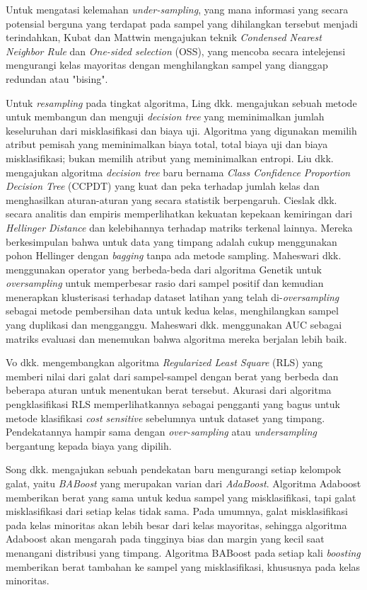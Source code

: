 Untuk mengatasi kelemahan \textit{under-sampling}, yang mana informasi yang secara potensial berguna yang terdapat pada sampel yang dihilangkan tersebut menjadi terindahkan, Kubat dan Mattwin \cite{kubat1997addressing} mengajukan teknik \textit{Condensed Nearest Neighbor Rule} dan \textit{One-sided selection} (OSS), yang mencoba secara intelejensi mengurangi kelas mayoritas dengan menghilangkan sampel yang dianggap redundan atau "bising".

Untuk \textit{resampling} pada tingkat algoritma, Ling dkk. \cite{ling2004decision} mengajukan sebuah metode untuk membangun dan menguji \textit{decision tree} yang meminimalkan jumlah keseluruhan dari misklasifikasi dan biaya uji.
Algoritma yang digunakan memilih atribut pemisah yang meminimalkan biaya total, total biaya uji dan biaya misklasifikasi; bukan memilih atribut yang meminimalkan entropi.
Liu dkk. \cite{liu2010robust} mengajukan algoritma \textit{decision tree} baru bernama \textit{Class Confidence Proportion Decision Tree} (CCPDT) yang kuat dan peka terhadap jumlah kelas dan menghasilkan aturan-aturan yang secara statistik berpengaruh.
Cieslak dkk. \cite{cieslak2012hellinger} secara analitis dan empiris memperlihatkan kekuatan kepekaan kemiringan dari \textit{Hellinger Distance} dan kelebihannya terhadap matriks terkenal lainnya.
Mereka berkesimpulan bahwa untuk data yang timpang adalah cukup menggunakan pohon Hellinger dengan \textit{bagging} tanpa ada metode sampling.
Maheswari dkk. \cite{maheshwari2011new} menggunakan operator yang berbeda-beda dari algoritma Genetik untuk \textit{oversampling} untuk memperbesar rasio dari sampel positif dan kemudian menerapkan klusterisasi terhadap dataset latihan yang telah di-\textit{oversampling} sebagai metode pembersihan data untuk kedua kelas, menghilangkan sampel yang duplikasi dan mengganggu.
Maheswari dkk. menggunakan AUC sebagai matriks evaluasi dan menemukan bahwa algoritma mereka berjalan lebih baik.

Vo dkk. \cite{vo2007classification} mengembangkan algoritma \textit{Regularized Least Square} (RLS) yang memberi nilai dari galat dari sampel-sampel dengan berat yang berbeda dan beberapa aturan untuk menentukan berat tersebut.
Akurasi dari algoritma pengklasifikasi RLS memperlihatkannya sebagai pengganti yang bagus untuk metode klasifikasi \textit{cost sensitive} sebelumnya untuk dataset yang timpang.
Pendekatannya hampir sama dengan \textit{over-sampling} atau \textit{undersampling} bergantung kepada biaya yang dipilih.

Song dkk. \cite{song2009improved} mengajukan sebuah pendekatan baru mengurangi setiap kelompok galat, yaitu \textit{BABoost} yang merupakan varian dari \textit{AdaBoost}.
Algoritma Adaboost memberikan berat yang sama untuk kedua sampel yang misklasifikasi, tapi galat misklasifikasi dari setiap kelas tidak sama.
Pada umumnya, galat misklasifikasi pada kelas minoritas akan lebih besar dari kelas mayoritas, sehingga algoritma Adaboost akan mengarah pada tingginya bias dan margin yang kecil saat menangani distribusi yang timpang.
Algoritma BABoost pada setiap kali \textit{boosting} memberikan berat tambahan ke sampel yang misklasifikasi, khususnya pada kelas minoritas.

